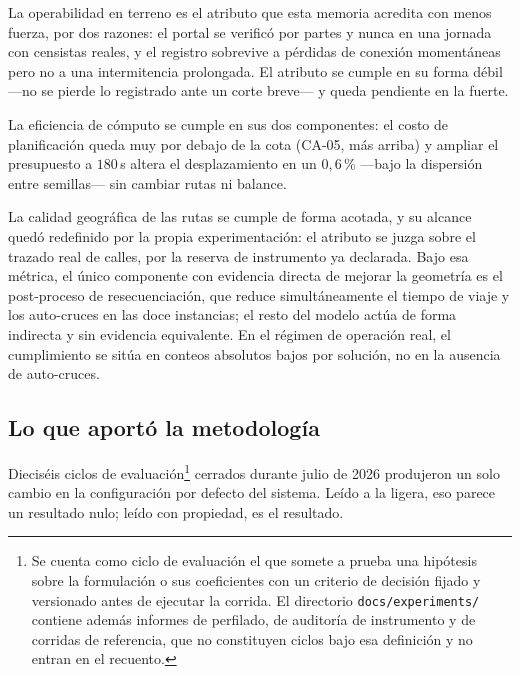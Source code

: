 La operabilidad en terreno es el atributo que esta memoria acredita con menos fuerza, por dos
razones: el portal se verificó por partes y nunca en una jornada con censistas reales, y el
registro sobrevive a pérdidas de conexión momentáneas pero no a una intermitencia prolongada. El
atributo se cumple en su forma débil ---no se pierde lo registrado ante un corte breve--- y queda
pendiente en la fuerte.

La eficiencia de cómputo se cumple en sus dos componentes: el costo de planificación queda muy por
debajo de la cota (CA-05, más arriba) y ampliar el presupuesto a $180$\,s altera el desplazamiento
en un $0{,}6$\,\% ---bajo la dispersión entre semillas--- sin cambiar rutas ni balance.

La calidad geográfica de las rutas se cumple de forma acotada, y su alcance quedó redefinido por la
propia experimentación: el atributo se juzga sobre el trazado real de calles, por la reserva de
instrumento ya declarada. Bajo esa
métrica, el único componente con evidencia directa de mejorar la geometría es el post-proceso de
resecuenciación, que reduce simultáneamente el tiempo de viaje y los auto-cruces en las doce
instancias; el resto del modelo actúa de forma indirecta y sin evidencia equivalente. En el régimen
de operación real, el cumplimiento se sitúa en conteos absolutos bajos por solución, no en la
ausencia de auto-cruces.

\subsection{Lo que aportó la metodología}

Dieciséis ciclos de evaluación\footnote{Se cuenta como ciclo de
evaluación el que somete a prueba una hipótesis sobre la formulación o sus coeficientes con un
criterio de decisión fijado y versionado antes de ejecutar la corrida. El directorio
\texttt{docs\slash experiments\slash } contiene además informes de perfilado, de auditoría de
instrumento y de corridas de referencia, que no constituyen ciclos bajo esa definición y no entran
en el recuento.} cerrados durante julio de 2026 produjeron un solo
cambio en la configuración por defecto del sistema. Leído a la ligera, eso parece un resultado nulo; leído con propiedad, es el resultado.

